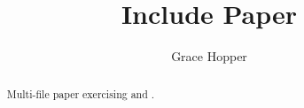 \documentclass{article}
\title{Include Paper}
\author{Grace Hopper}
\begin{document}
\maketitle
\begin{abstract}
Multi-file paper exercising \verb|| and \verb||.
\end{abstract}



\end{document}
